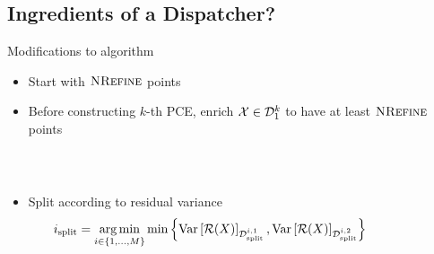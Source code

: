 \documentclass{rsuqbeamernew}
\DeclareMathOperator*{\argmin}{arg\,min}
\newcommand{\NRefine}{\textsc{NRefine}}
\newcommand{\BParams}{1}
\begin{document}
\subsection{Ingredients of a Dispatcher?}
\begin{frame}[t]{Modifications to algorithm}
  \small
  \begin{itemize}
    \item Start with $\NRefine$ points
    \item Before constructing $k$-th PCE, enrich $\cx\in\cd_{\BParams}^k$ 
    to have at least $\NRefine$ points
  \end{itemize}
  \pause
  \vspace{2em}
  \pause
  \\
  \begin{columns}
    \begin{column}[T]{0.75\linewidth}
      \begin{itemize}
        \item Split according to {\altx residual variance}
        {\scriptsize
          \begin{equation*}
          i_{\mathrm{split}}=\argmin_{i\in\{1,\dots,M\}} \min 
          \left\{\Var{\mathcal{R}(X)}_{\cd_{\mathrm{split}}^{i,1}}, 
          \Var{\mathcal{R}(X)}_{\cd_{\mathrm{split}}^{i,2}}\right\}
          \end{equation*}
        }
      \end{itemize}
    \end{column}
    \begin{column}[T]{0.25\linewidth}
    \end{column}
  \end{columns}
\end{frame}
\end{document}
